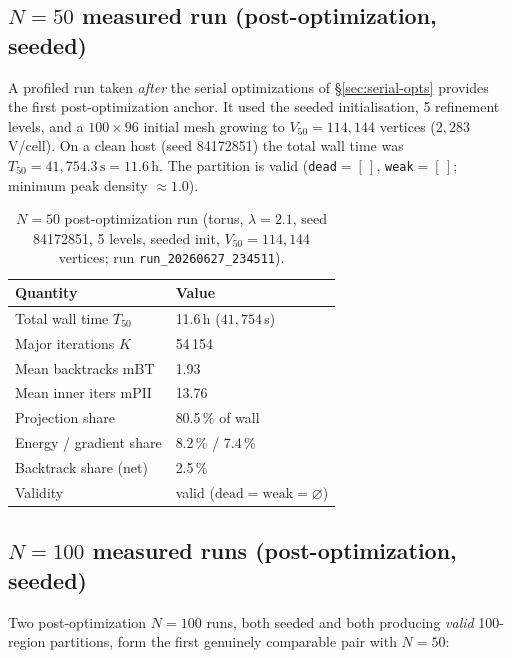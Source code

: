 \documentclass[11pt,a4paper]{article}
\begin{document}
\subsection{$N = 50$ measured run (post-optimization, seeded)}
\label{sec:n50}

A profiled run taken \emph{after} the serial optimizations of
\S\ref{sec:serial-opts} provides the first post-optimization anchor.  It used
the seeded initialisation, 5 refinement levels, and a $100\times96$ initial
mesh growing to $V_{50}=114{,}144$ vertices ($2{,}283$ V/cell).  On a clean
host (seed 84172851) the total wall time was
$T_{50}=41{,}754.3\,\text{s} = \mathbf{11.6}$\,h.  The partition is valid
(\texttt{dead}$=[\,]$, \texttt{weak}$=[\,]$; minimum peak density $\approx1.0$).

\begin{table}[H]
\centering
\caption{$N=50$ post-optimization run (torus, $\lambda=2.1$, seed 84172851,
5 levels, seeded init, $V_{50}=114{,}144$ vertices; run
\texttt{run\_20260627\_234511}).}
\label{tab:n50}
\renewcommand{\arraystretch}{1.2}
\begin{tabular}{ll}
\toprule
\textbf{Quantity} & \textbf{Value} \\
\midrule
Total wall time $T_{50}$       & 11.6\,h ($41{,}754$\,s) \\
Major iterations $K$           & 54\,154 \\
Mean backtracks $\mathrm{mBT}$ & 1.93 \\
Mean inner iters $\mathrm{mPII}$ & 13.76 \\
Projection share               & 80.5\,\% of wall \\
Energy / gradient share        & 8.2\,\% / 7.4\,\% \\
Backtrack share (net)          & 2.5\,\% \\
Validity                       & valid ($\mathrm{dead}=\mathrm{weak}=\varnothing$) \\
\bottomrule
\end{tabular}
\end{table}

\subsection{$N = 100$ measured runs (post-optimization, seeded)}
\label{sec:n100}

Two post-optimization $N=100$ runs, both seeded and both producing
\emph{valid} 100-region partitions, form the first genuinely comparable pair
with $N=50$:
\end{document}
